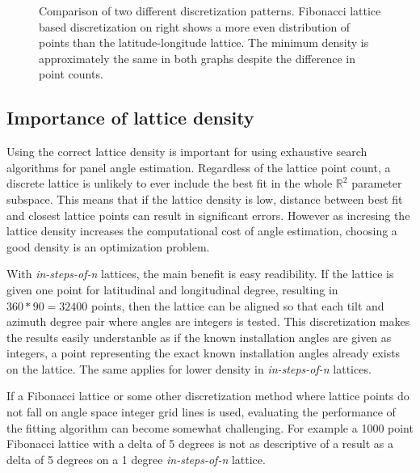\begin{figure}
\caption{Comparison of two different discretization patterns. Fibonacci lattice based discretization on right shows a more even distribution of points than the latitude-longitude lattice. The minimum density is approximately the same in both graphs despite the difference in point counts.}
     \label{fig_5stepfibolat}
\end{figure}

\newpage
\subsection{Importance of lattice density}\label{ss_lattice_density}
Using the correct lattice density is important for using exhaustive search algorithms for panel angle estimation. Regardless of the lattice point count, a discrete lattice is unlikely to ever include the best fit in the whole $\mathbb{R}^2$ parameter subspace. This means that if the lattice density is low, distance between best fit and closest lattice points can result in significant errors. However as incresing the lattice density increases the computational cost of angle estimation, choosing a good density is an optimization problem.

With \textit{in-steps-of-n} lattices, the main benefit is easy readibility. If the lattice is given one point for latitudinal and longitudinal degree, resulting in $360*90=32400$ points, then the lattice can be aligned so that each tilt and azimuth degree pair where angles are integers is tested. This discretization makes the results easily understanble as if the known installation angles are given as integers, a point representing the exact known installation angles already exists on the lattice. The same applies for lower density in \textit{in-steps-of-n} lattices.

If a Fibonacci lattice or some other discretization method where lattice points do not fall on angle space integer grid lines is used, evaluating the performance of the fitting algorithm can become somewhat challenging. For example a 1000 point Fibonacci lattice with a delta of 5 degrees is not as descriptive of a result as a delta of 5 degrees on a 1 degree \textit{in-steps-of-n} lattice.



